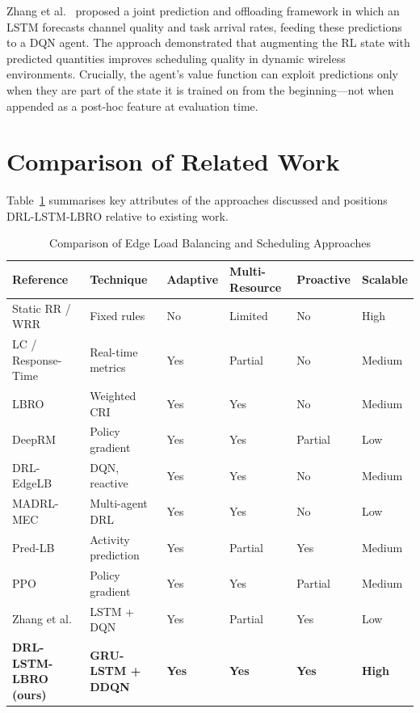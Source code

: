 Zhang et al.~\cite{zhang2021joint} proposed a joint prediction and
offloading framework in which an LSTM forecasts channel quality and
task arrival rates, feeding these predictions to a DQN agent.
The approach demonstrated that augmenting the RL state with
predicted quantities improves scheduling quality in dynamic
wireless environments. Crucially, the agent's value function can
exploit predictions only when they are part of the state it is
trained on from the beginning---not when appended as a post-hoc
feature at evaluation time.

\section{Comparison of Related Work}
\label{sec:lit_comparison}

Table~\ref{tab:related_summary} summarises key attributes of
the approaches discussed and positions DRL-LSTM-LBRO relative
to existing work.

\begin{table}[htbp]
\centering
\caption{Comparison of Edge Load Balancing and Scheduling Approaches}
\label{tab:related_summary}
\footnotesize
\renewcommand{\arraystretch}{1.15}
\begin{tabular}{|p{2.8cm}|p{2.5cm}|p{1.1cm}|p{1.5cm}|p{1.3cm}|p{1.3cm}|}
\hline
\textbf{Reference} &
\textbf{Technique} &
\textbf{Adaptive} &
\textbf{Multi-Resource} &
\textbf{Proactive} &
\textbf{Scalable} \\
\hline
Static RR / WRR & Fixed rules & No & Limited & No & High \\
\hline
LC / Response-Time & Real-time metrics & Yes & Partial & No & Medium \\
\hline
LBRO \cite{nayyer2022lbro} & Weighted CRI & Yes & Yes & No & Medium \\
\hline
DeepRM \cite{mao2016resource} & Policy gradient & Yes & Yes & Partial & Low \\
\hline
DRL-EdgeLB \cite{liu2022edgelb} & DQN, reactive & Yes & Yes & No & Medium \\
\hline
MADRL-MEC \cite{zhao2022madrl} & Multi-agent DRL & Yes & Yes & No & Low \\
\hline
Pred-LB \cite{predlb2025} & Activity prediction & Yes & Partial & Yes & Medium \\
\hline
PPO \cite{schulman2017ppo} & Policy gradient & Yes & Yes & Partial & Medium \\
\hline
Zhang et al.\ \cite{zhang2021joint} & LSTM + DQN & Yes & Partial & Yes & Low \\
\hline
\textbf{DRL-LSTM-LBRO (ours)} & \textbf{GRU-LSTM + DDQN} & \textbf{Yes} & \textbf{Yes} & \textbf{Yes} & \textbf{High} \\
\hline
\end{tabular}
\end{table}

